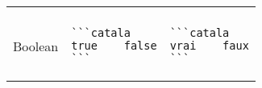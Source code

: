 \documentclass[a3paper,landscape]{article}
\begin{document}
\begin{multicols*}{2}
\begin{center}
\begin{tabular}{p{}p{}p{}}
\vspace*{-1.75em}
\\
Boolean&
\vspace*{-1.75em}
\begin{verbatim}
```catala
true    false
```
\end{verbatim}
\vspace*{-1.75em}
&
\vspace*{-1.75em}
\begin{verbatim}
```catala
vrai    faux
```
\end{verbatim}
\vspace*{-1.75em}
\\
\bottomrule
\end{tabular}
\end{center}






\end{multicols*}
\end{document}
